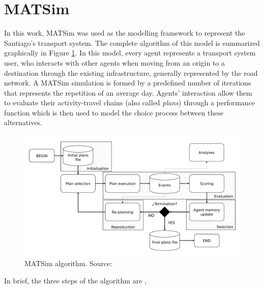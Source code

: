 \documentclass[Journal,letterpaper]{ascelike-new}
\begin{document}
\section{MATSim}
\label{sec:matsim}
In this work, MATSim was used as the modelling framework to represent the Santiago's transport system. The complete algorithm of this model is summarized graphically in Figure \ref{fig:matsim_algorithm}. 
In this model, every agent represents a transport system user, who interacts with other agents when moving from an origin to a destination through the existing infrastructure, generally represented by the road network. A MATSim simulation is formed by a predefined number of iterations that represents the repetition of an average day. Agents' interaction allow them to evaluate their activity-travel chains (also called \emph{plans}) through a performance function which is then used to model the choice process between these alternatives.
\begin{figure}
    \centering
    \includegraphics[scale=0.4]{images/0_algoritmo.pdf}
    \caption{MATSim algorithm. Source: \protect\cite{meister2011contribution}}
    \label{fig:matsim_algorithm}
\end{figure}
In brief, the three steps of the algorithm are \citep{KickhoeferEtAl2016},
\end{document}
